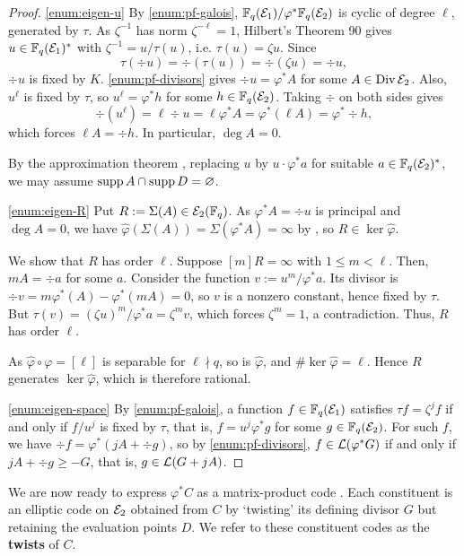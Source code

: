 \documentclass[twocolumn, 11pt]{scrartcl}
\begin{document}
\begin{proof}
\ref{enum:eigen-u} By \ref{enum:pf-galois}, $\bbF_q(\mcE_1)/\varphi^*\bbF_q(\mcE_2)$ is cyclic of degree $\ell$, generated by $\tau$. As $\zeta^{-1}$ has norm $\zeta^{-\ell}=1$, Hilbert's Theorem 90 \cite[Thm.~VI.6.1]{lang2002algebra} gives $u\in\bbF_q(\mcE_1)^*$ with $\zeta^{-1}=u/\tau(u)$, i.e. $\tau(u)=\zeta u$. Since
\[ \tau(\div u)=\div(\tau(u))=\div(\zeta u)=\div u,\]
$\div u$ is fixed by $K$. \ref{enum:pf-divisors} gives $\div u=\varphi^*A$ for some $A\in\Div\mcE_2$. Also, $u^\ell$ is fixed by $\tau$, so $u^\ell=\varphi^*h$ for some $h\in\bbF_q(\mcE_2)$. Taking $\div$ on both sides gives
\[ \div(u^\ell)=\ell\div u=\ell\varphi^*A=\varphi^*(\ell A)=\varphi^*\div h,\]
which forces $\ell A=\div h$. In particular, $\deg A=0$.

By the approximation theorem \cite[Thm.~1.3.1]{stichtenoth2009algebraic}, replacing $u$ by $u\cdot\varphi^*a$ for suitable $a\in\bbF_q(\mcE_2)^*$, we may assume $\supp A\cap\supp D=\emptyset$.

\ref{enum:eigen-R} Put $R:=\Sigma(A)\in\mcE_2(\bbF_q)$. As $\varphi^*A=\div u$ is principal and $\deg A=0$, we have $\hat\varphi(\Sigma(A))=\Sigma(\varphi^*A)=\infty$ by , so $R\in\ker\hat\varphi$.

We show that $R$ has order $\ell$. Suppose $[m]R=\infty$ with $1\leq m<\ell$. Then, $mA=\div a$ for some $a$. Consider the function $v:=u^m/\varphi^*a$. Its divisor is $\div v=m\varphi^*(A)-\varphi^*(mA)=0$, so $v$ is a nonzero constant, hence fixed by $\tau$. But $\tau(v)=(\zeta u)^m/\varphi^*a=\zeta^m v$, which forces $\zeta^m=1$, a contradiction. Thus, $R$ has order $\ell$.

As $\hat\varphi\circ\varphi=[\ell]$ is separable for $\ell\nmid q$, so is $\hat\varphi$, and $\#\ker\hat\varphi=\ell$. Hence $R$ generates $\ker\hat\varphi$, which is therefore rational.

\ref{enum:eigen-space} By \ref{enum:pf-galois}, a function $f\in\bbF_q(\mcE_1)$ satisfies $\tau f=\zeta^jf$ if and only if $f/u^j$ is fixed by $\tau$, that is, $f=u^j\varphi^*g$ for some $g\in\bbF_q(\mcE_2)$. For such $f$, we have $\div f=\varphi^*(jA+\div g)$, so by \ref{enum:pf-divisors}, $f\in\mcL(\varphi^*G)$ if and only if $jA+\div g\geq-G$, that is, $g\in\mcL(G+jA)$.
\end{proof}

We are now ready to express $\varphi^*C$ as a matrix-product code \cite{blackmore2001matrix}. Each constituent is an elliptic code on $\mcE_2$ obtained from $C$ by `twisting' its defining divisor $G$ but retaining the evaluation points $D$. We refer to these constituent codes as the \textbf{twists} of $C$.
\end{document}

